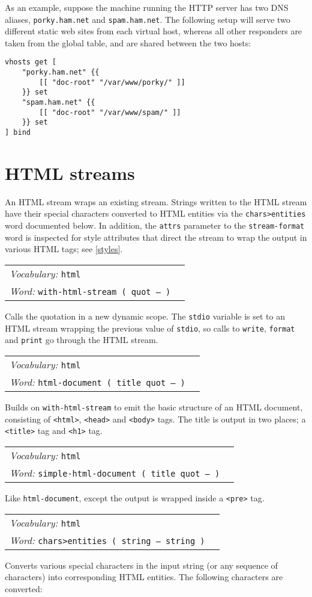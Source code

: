 \documentclass{book}
\newcommand{\vocabulary}[1]{\emph{Vocabulary:} \texttt{#1}&\\}
\newcommand{\ordinaryword}[2]{\index{\texttt{#1}}\emph{Word:} \texttt{#2}&\\}
\newcommand{\wordtable}[1]{


\begin{tabularx}{12cm}{lX}
\hline
#1
\hline
\end{tabularx}

}
\begin{document}
As an example, suppose the machine running the HTTP server has two DNS aliases, \verb|porky.ham.net| and \verb|spam.ham.net|. The following setup will serve two different static web sites from each virtual host, whereas all other responders are taken from the global table, and are shared between the two hosts:

\begin{verbatim}
vhosts get [
    "porky.ham.net" {{
        [[ "doc-root" "/var/www/porky/" ]]
    }} set
    "spam.ham.net" {{
        [[ "doc-root" "/var/www/spam/" ]]
    }} set
] bind
\end{verbatim}

\section{HTML streams}\label{html}

An HTML stream wraps an existing stream. Strings written to the HTML stream have their special characters converted to HTML entities via the \verb|chars>entities| word documented below. In addition, the \texttt{attrs} parameter to the \texttt{stream-format} word is inspected for style attributes that direct the stream to wrap the output in various HTML tags; see \ref{styles}.

\wordtable{
\vocabulary{html}
\ordinaryword{with-html-stream}{with-html-stream ( quot -- )}
}
Calls the quotation in a new dynamic scope. The \texttt{stdio} variable is set to an HTML stream wrapping the previous value of \texttt{stdio}, so calls to \texttt{write}, \texttt{format} and \texttt{print} go through the HTML stream.

\wordtable{
\vocabulary{html}
\ordinaryword{html-document}{html-document ( title quot -- )}
}
Builds on \texttt{with-html-stream} to emit the basic structure of an HTML document, consisting of \texttt{<html>}, \texttt{<head>} and \texttt{<body>} tags. The title is output in two places; a \texttt{<title>} tag  and \texttt{<h1>} tag.

\wordtable{
\vocabulary{html}
\ordinaryword{simple-html-document}{simple-html-document ( title quot -- )}
}
Like \texttt{html-document}, except the output is wrapped inside a \texttt{<pre>} tag.

\wordtable{
\vocabulary{html}
\ordinaryword{chars>entities}{chars>entities ( string -- string )}
}
Converts various special characters in the input string (or any sequence of characters) into corresponding HTML entities. The following characters are converted:
\end{document}
